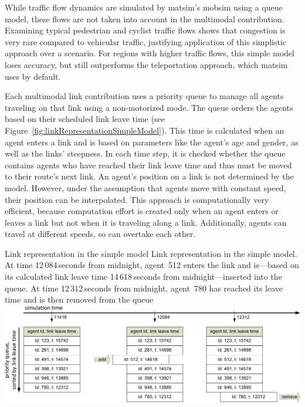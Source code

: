 While traffic flow dynamics are simulated by \gls{matsim}'s \gls{mobsim} using a queue model, these flows are not taken into account in the \gls{multimodal} contribution. Examining typical pedestrian and cyclist traffic flows shows that congestion is very rare compared to vehicular traffic, justifying application of this simplistic approach over a scenario. For regions with higher traffic flows, this simple model loses accuracy, but still outperforms the \gls{teleportation} approach, which \gls{matsim} uses by default.

Each \gls{multimodal} link contribution uses a priority queue to manage all agents traveling on that link using a non-motorized mode. The queue orders the agents based on their scheduled link leave time (see Figure~\ref{fig:linkRepresentationSimpleModel}). This time is calculated when an agent enters a link and is based on parameters like the agent's age and gender, as well as the links' steepness. In each time step, it is checked whether the queue contains agents who have reached their link leave time and thus must be moved to their route's next link. An agent's position on a link is not determined by the model. However, under the assumption that agents move with constant speed, their position can be interpolated. This approach is computationally very efficient, because computation effort is created only when an agent enters or leaves a link but not when it is traveling along a link. Additionally, agents can travel at different speeds, so can overtake each other.

\createfigure%
{Link representation in the simple model}%
{Link representation in the simple model. \\At time 12\,084\,seconds from midnight, agent~512 enters the link and is---based on its calculated link leave time 14\,618\,seconds from midnight---inserted into the queue. At time 12\,312\,seconds from midnight, agent~780 has reached its leave time and is then removed from the queue}%
{\label{fig:linkRepresentationSimpleModel}}%
{\includegraphics[width=1.0\textwidth, angle=0]{extending/figures/MultiModalSimulation/linkRepresentation}}%
{}


